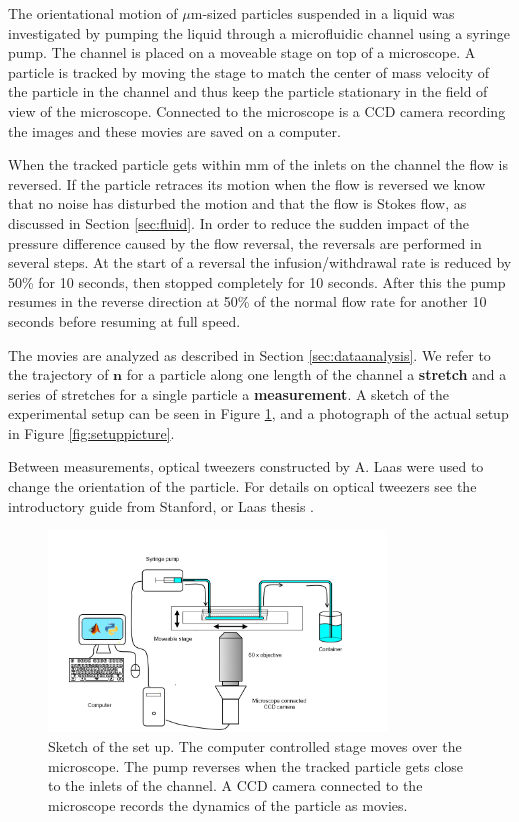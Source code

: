 \label{sec:exp_setup}
The orientational motion of $\mu$m-sized particles suspended in a liquid was investigated by pumping the liquid through a microfluidic channel using a syringe pump. The channel is placed on a moveable stage on top of a microscope. A particle is tracked by moving the stage to match the center of mass velocity of the particle in the channel and thus keep the particle stationary in the field of view of the microscope. Connected to the microscope is a CCD camera recording the images and these movies are saved on a computer. 

When the tracked particle gets within \unit[10]{mm} of the inlets on the channel the flow is reversed. If the particle retraces its motion when the flow is reversed we know that no noise has disturbed the motion and that the flow is Stokes flow, as discussed in Section \ref{sec:fluid}. In order to reduce the sudden impact of the pressure difference caused by the flow reversal, the reversals are performed in several steps. At the start of a reversal the infusion/withdrawal rate is reduced by 50\% for 10 seconds, then stopped completely for 10 seconds. After this the pump resumes in the reverse direction at 50\% of the normal flow rate for another 10 seconds before resuming at full speed. 

The movies are analyzed as described in Section \ref{sec:dataanalysis}. We refer to the trajectory of $\mathbf{n}$ for a particle along one length of the channel a \textbf{stretch} and a series of stretches for a single particle a \textbf{measurement}. A sketch of the experimental setup can be seen in Figure \ref{fig:setupsketch}, and a photograph of the actual setup in Figure \ref{fig:setuppicture}. 

Between measurements, optical tweezers constructed by A. Laas were used to change the orientation of the particle. For details on optical tweezers see the introductory guide from Stanford, \cite{OpticalTweezer} or Laas thesis \cite{alexanderThesis}. 


\begin{figure}[H]
\centering
\includegraphics[width=0.8\textwidth]{figures/method/setupsketch.png}
\caption{Sketch of the set up. The computer controlled stage moves over the microscope. The pump reverses when the tracked particle gets close to the inlets of the channel. A CCD camera connected to the microscope records the dynamics of the particle as movies.}\label{fig:setupsketch}
\end{figure}

